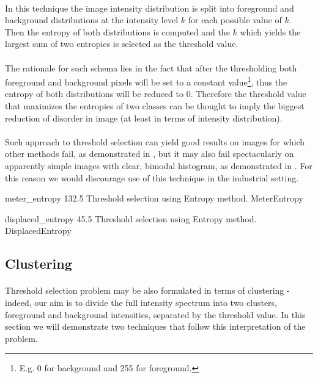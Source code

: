 \paragraph*{}
In this technique the image intensity distribution is split into foreground and background distributions at the intensity level $k$ for each possible value of $k$. Then the entropy of both distributions is computed and the $k$ which yields the largest sum of two entropies is selected as the threshold value.

\paragraph*{}
The rationale for such schema lies in the fact that after the thresholding both foreground and background pixels will be set to a constant value\footnote{E.g. 0 for background and 255 for foreground.}, thus the entropy of both distributions will be reduced to 0. Therefore the threshold value that maximizes the entropies of two classes can be thought to imply the biggest reduction of disorder in image (at least in terms of intensity distribution).

\paragraph*{}
Such approach to threshold selection can yield good results on images for which other methods fail, as demonstrated in , but it may also fail spectacularly on apparently simple images with clear, bimodal histogram, as demonstrated in . For this reason we would discourage use of this technique in the industrial setting.

\thresholdFigure
{meter_entropy}
{132.5}
{Threshold selection using Entropy method.}
{MeterEntropy}

\thresholdFigure
{displaced_entropy}
{45.5}
{Threshold selection using Entropy method.}
{DisplacedEntropy}

\subsection{Clustering}

\paragraph*{}
Threshold selection problem may be also formulated in terms of clustering - indeed, our aim is to divide the full intensity spectrum into two clusters, foreground and background intensities, separated by the threshold value. In this section we will demonstrate two techniques that follow this interpretation of the problem. 

